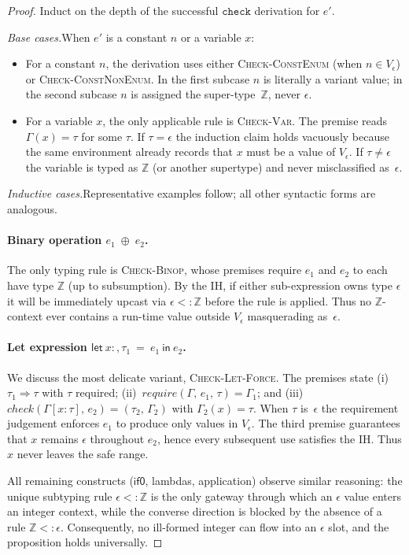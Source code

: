 \documentclass[peerreview, 10pt]{IEEEtran}
\newcommand{\Z}{\ensuremath{\mathbb{Z}}}
\newcommand{\lett}[4]{\ensuremath{\mathsf{let}\ #1\mathsf{:},#2\ \mathsf{=}\ #3\ \mathsf{in}\ #4}}
\newcommand{\checktype}[4]{\ensuremath{{check}(#1,\,#2)=(#3,\,#4)}}
\newcommand{\requiretype}[4]{\ensuremath{{require}(#1,\,#2,\,#3)=#4}}
\theoremstyle{plain}
\begin{document}
\begin{proof}
Induct on the depth of the successful $\texttt{check}$ derivation for $e'$.

\emph{Base cases.}\;When $e'$ is a constant $n$ or a variable $x$:
\begin{itemize}[leftmargin=*]
    \item For a constant $n$, the derivation uses either \textsc{Check-ConstEnum} (when $n\in V_{\epsilon}$) or \textsc{Check-ConstNonEnum}.  In the first subcase $n$ is literally a variant value; in the second subcase $n$ is assigned the super\nobreakdash-type~$\Z$, never $\epsilon$.
    \item For a variable $x$, the only applicable rule is \textsc{Check-Var}.  The premise reads $\Gamma(x)=\tau$ for some $\tau$.  If $\tau=\epsilon$ the induction claim holds vacuously because the same environment already records that $x$ must be a value of $V_{\epsilon}$.  If $\tau\neq\epsilon$ the variable is typed as $\Z$ (or another supertype) and never misclassified as~$\epsilon$.
\end{itemize}

\emph{Inductive cases.}\;Representative examples follow; all other syntactic forms are analogous.

\paragraph*{Binary operation $e_1\;\oplus\;e_2$.}  The only typing rule is \textsc{Check-Binop}, whose premises require $e_1$ and $e_2$ to each have type $\Z$ (up to subsumption).  By the IH, if either sub\nobreakdash-expression owns type $\epsilon$ it will be immediately upcast via $\epsilon<:\Z$ before the rule is applied.  Thus no $\Z$\nobreakdash-context ever contains a run\nobreakdash-time value outside $V_{\epsilon}$ masquerading as~$\epsilon$.

\paragraph*{Let expression $\lett{x}{\tau_1}{e_1}{e_2}$.}  We discuss the most delicate variant, \textsc{Check-Let-Force}.  The premises state (i)~$\tau_1 \Rightarrow \tau$ with $\tau$ required; (ii)~$\requiretype{\Gamma}{e_1}{\tau}{\Gamma_1}$; and (iii)~$\checktype{\Gamma[x{:}\tau]}{e_2}{\tau_2}{\Gamma_2}$ with $\Gamma_2(x)=\tau$.  When $\tau$ is~$\epsilon$ the requirement judgement enforces $e_1$ to produce only values in $V_{\epsilon}$.  The third premise guarantees that $x$ remains $\epsilon$ throughout $e_2$, hence every subsequent use satisfies the IH.  Thus $x$ never leaves the safe range.

All remaining constructs ($\textsf{if0}$, lambdas, application) observe similar reasoning: the unique subtyping rule $\epsilon<:\Z$ is the only gateway through which an $\epsilon$ value enters an integer context, while the converse direction is blocked by the absence of a rule $\Z<:\epsilon$.  Consequently, no ill-formed integer can flow into an $\epsilon$ slot, and the proposition holds universally.
\end{proof}
\end{document}
